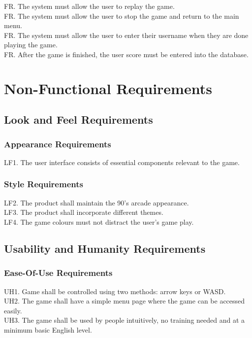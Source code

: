 \documentclass[12pt]{article}
\begin{document}
FR. The system must allow the user to replay the game. \\

FR. The system must allow the user to stop the game and return to the main menu. \\

FR. The system must allow the user to enter their username when they are done playing the game. \\

FR. After the game is finished, the user score must be entered into the database. \\



\section{Non-Functional Requirements}
    \subsection{Look and Feel Requirements}
        \subsubsection{Appearance Requirements}
        LF1. The user interface consists of essential components relevant to the game.
        \subsubsection{Style Requirements} 
    	LF2. The product shall maintain the 90's arcade appearance.\\
    	LF3. The product shall incorporate different themes.\\
    	LF4. The game colours must not distract the user's game play.
   
\subsection{Usability and Humanity Requirements}
    \subsubsection{Ease-Of-Use Requirements}
    UH1. Game shall be controlled using two methods: arrow keys or WASD.\\
    UH2. The game shall have a simple menu page where the game can be accessed easily.\\
    UH3. The game shall be used by people intuitively, no training needed and at a minimum basic English level.
    
\end{document}
